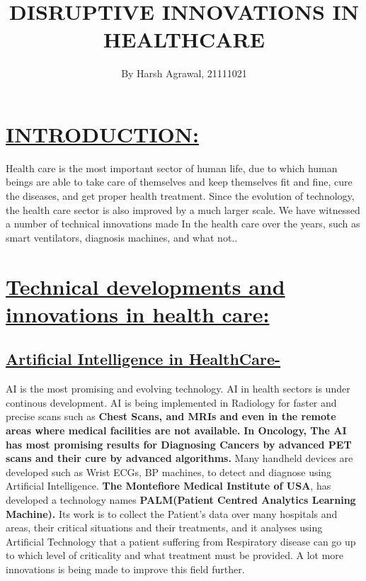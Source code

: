 \documentclass[18pt]{article}
\title{\textbf{DISRUPTIVE INNOVATIONS IN HEALTHCARE}}
\author{By Harsh Agrawal, 21111021}
\date{}
\begin{document}
\maketitle
\section{\underline{INTRODUCTION:}}
Health care is the most important sector of human life, due to which human beings are able to take care of themselves and keep themselves fit and fine, cure the diseases, and get proper health treatment.
Since the evolution of technology, the health care sector is also improved by a much larger scale.
We have witnessed a number of technical innovations made In the health care over the years, such as smart ventilators, diagnosis machines, and what not..

\section{\underline{ Technical developments and innovations in health care:}}
\subsection{\underline{Artificial Intelligence in HealthCare-}}
AI is the most promising and evolving technology. AI in health sectors is under continous development.
\newline AI is being implemented in Radiology for faster and precise scans such as  \textbf{Chest Scans, and MRIs and even in the remote areas where medical facilities are not available.}
\newline \textbf{In Oncology, The AI has most promising results for Diagnosing Cancers by advanced PET scans and their cure by advanced algorithms.}
\newline Many handheld devices are developed such as Wrist ECGs, BP machines, to detect and diagnose using Artificial Intelligence.
\newline \textbf{The Montefiore Medical Institute of USA}, has developed a technology names \textbf{PALM(Patient Centred Analytics Learning Machine).} Its work is to collect the Patient’s data over many hospitals and areas, their critical situations and their treatments, and it analyses using Artificial Technology that a patient suffering from Respiratory disease can go up to which level of criticality and what treatment must be provided. 
A lot more innovations is being made to improve this field further.
\end{document}
